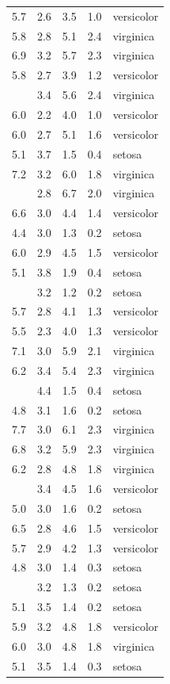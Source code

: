 \documentclass[
]{article}
\begin{document}
\begin{longtable}[t]{rrrrl}
5.7 & 2.6 & 3.5 & 1.0 & versicolor\\
5.8 & 2.8 & 5.1 & 2.4 & virginica\\
6.9 & 3.2 & 5.7 & 2.3 & virginica\\
5.8 & 2.7 & 3.9 & 1.2 & versicolor\\
\addlinespace
6.3 & 3.4 & 5.6 & 2.4 & virginica\\
6.0 & 2.2 & 4.0 & 1.0 & versicolor\\
6.0 & 2.7 & 5.1 & 1.6 & versicolor\\
5.1 & 3.7 & 1.5 & 0.4 & setosa\\
7.2 & 3.2 & 6.0 & 1.8 & virginica\\
\addlinespace
7.7 & 2.8 & 6.7 & 2.0 & virginica\\
6.6 & 3.0 & 4.4 & 1.4 & versicolor\\
4.4 & 3.0 & 1.3 & 0.2 & setosa\\
6.0 & 2.9 & 4.5 & 1.5 & versicolor\\
5.1 & 3.8 & 1.9 & 0.4 & setosa\\
\addlinespace
5.0 & 3.2 & 1.2 & 0.2 & setosa\\
5.7 & 2.8 & 4.1 & 1.3 & versicolor\\
5.5 & 2.3 & 4.0 & 1.3 & versicolor\\
7.1 & 3.0 & 5.9 & 2.1 & virginica\\
6.2 & 3.4 & 5.4 & 2.3 & virginica\\
\addlinespace
5.7 & 4.4 & 1.5 & 0.4 & setosa\\
4.8 & 3.1 & 1.6 & 0.2 & setosa\\
7.7 & 3.0 & 6.1 & 2.3 & virginica\\
6.8 & 3.2 & 5.9 & 2.3 & virginica\\
6.2 & 2.8 & 4.8 & 1.8 & virginica\\
\addlinespace
6.0 & 3.4 & 4.5 & 1.6 & versicolor\\
5.0 & 3.0 & 1.6 & 0.2 & setosa\\
6.5 & 2.8 & 4.6 & 1.5 & versicolor\\
5.7 & 2.9 & 4.2 & 1.3 & versicolor\\
4.8 & 3.0 & 1.4 & 0.3 & setosa\\
\addlinespace
4.7 & 3.2 & 1.3 & 0.2 & setosa\\
5.1 & 3.5 & 1.4 & 0.2 & setosa\\
5.9 & 3.2 & 4.8 & 1.8 & versicolor\\
6.0 & 3.0 & 4.8 & 1.8 & virginica\\
5.1 & 3.5 & 1.4 & 0.3 & setosa\\

\end{longtable}
\end{document}
